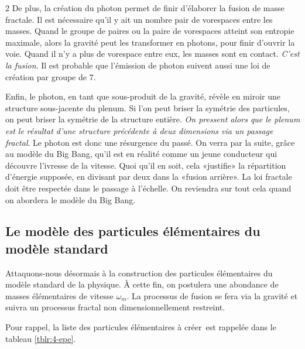 \begin{multicols}{2}
De plus, la création du photon permet de finir d'élaborer la fusion de
masse fractale. Il est nécessaire qu'il y ait un nombre pair de
vorespaces entre les masses. Quand le groupe de paires ou la paire de
vorespaces atteint son entropie maximale, alors la gravité peut les
transformer en photons, pour finir d'ouvrir la voie. Quand il n'y a
plus de vorespace entre eux, les masses sont en contact. \textit{C'est la
fusion}. Il est probable que l'émission de photon suivent aussi une loi
de création par groupe de 7.

Enfin, le photon, en tant que sous-produit de la gravité, révèle en
miroir une structure sous-jacente du plenum. Si l'on peut briser la
symétrie des particules, on peut briser la symétrie de la structure
entière. \textit{On pressent alors que le plenum est le résultat d'une
structure précédente à deux dimensions via un passage fractal}. Le
photon est donc une résurgence du passé. On verra par la suite, grâce
au modèle du Big Bang, qu'il est en réalité comme un jeune conducteur qui
découvre l'ivresse de la vitesse. Quoi qu'il en soit, cela
«justifie» la répartition d'énergie supposée, en divisant par deux
dans la «fusion arrière». La loi fractale doit être respectée dans
le passage à l'échelle. On reviendra sur tout cela quand on abordera
le modèle du Big Bang.

\subsection{Le modèle des particules élémentaires du modèle standard}

Attaquons-nous désormais à la construction des particules élémentaires
du modèle standard de la physique. À cette fin, on postulera une
abondance de masses élémentaires de vitesse $\omega_m$. La processus de fusion
se fera via la gravité et suivra un processus fractal non
dimensionnellement restreint.

Pour rappel, la liste des particules élémentaires à créer est rappelée dans le tableau \ref{tblr:4-epe}.


\end{multicols}
